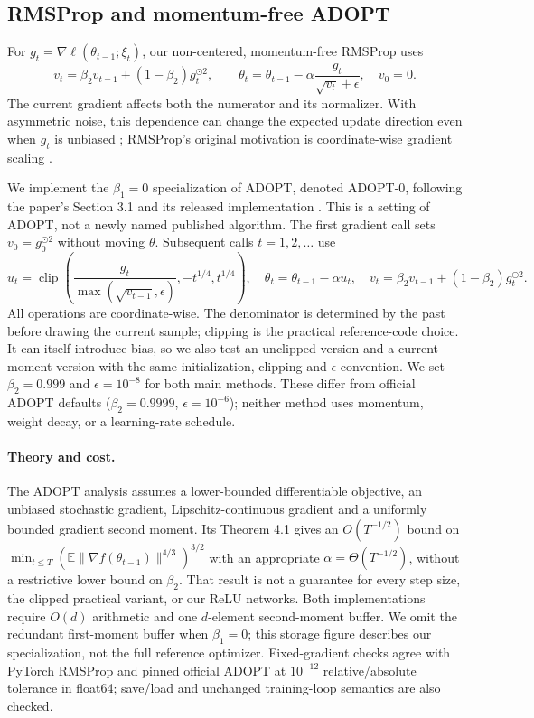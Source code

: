 \subsection{RMSProp and momentum-free ADOPT}\label{sec:method-m3}
For $g_t=\nabla\ell(\theta_{t-1};\xi_t)$, our non-centered, momentum-free RMSProp uses
\begin{equation}
 v_t=\beta_2v_{t-1}+(1-\beta_2)g_t^{\odot2},\qquad
 \theta_t=\theta_{t-1}-\alpha\frac{g_t}{\sqrt{v_t}+\epsilon},\quad v_0=0.
\end{equation}
The current gradient affects both the numerator and its normalizer. With asymmetric noise,
this dependence can change the expected update direction even when $g_t$ is unbiased
\citep{taniguchi2024adopt}; RMSProp's original motivation is coordinate-wise gradient scaling
\citep{hintonrmsprop}.

We implement the $\beta_1=0$ specialization of ADOPT, denoted ADOPT-0, following the
paper's Section 3.1 and its released implementation \citep{taniguchi2024adopt}.
This is a setting of ADOPT, not a newly named published algorithm.
The first gradient call sets $v_0=g_0^{\odot2}$ without moving $\theta$.
Subsequent calls $t=1,2,\ldots$ use
\begin{equation}\label{eq:m3-adopt}
 u_t=\operatorname{clip}\!\left(\frac{g_t}{\max(\sqrt{v_{t-1}},\epsilon)},-t^{1/4},t^{1/4}\right),\quad
 \theta_t=\theta_{t-1}-\alpha u_t,\quad
 v_t=\beta_2v_{t-1}+(1-\beta_2)g_t^{\odot2}.
\end{equation}
All operations are coordinate-wise. The denominator is determined by the past before drawing
the current sample; clipping is the practical reference-code choice. It can itself introduce
bias, so we also test an unclipped version and a current-moment version with the same
initialization, clipping and $\epsilon$ convention. We set $\beta_2=0.999$ and $\epsilon=10^{-8}$
for both main methods. These differ from official ADOPT defaults ($\beta_2=0.9999$,
$\epsilon=10^{-6}$); neither method uses momentum, weight decay, or a learning-rate schedule.

\paragraph{Theory and cost.}
The ADOPT analysis assumes a lower-bounded differentiable objective, an unbiased stochastic
gradient, Lipschitz-continuous gradient and a uniformly bounded gradient second moment.
Its Theorem 4.1 gives an $O(T^{-1/2})$ bound on
$\min_{t\leq T}(\mathbb E\|\nabla f(\theta_{t-1})\|^{4/3})^{3/2}$ with an appropriate
$\alpha=\Theta(T^{-1/2})$, without a restrictive lower bound on $\beta_2$.
That result is not a guarantee for every step size, the clipped practical variant, or our
ReLU networks. Both implementations require $O(d)$ arithmetic and one $d$-element
second-moment buffer. We omit the redundant first-moment buffer when $\beta_1=0$;
this storage figure describes our specialization, not the full reference optimizer.
Fixed-gradient checks agree with PyTorch RMSProp and pinned official ADOPT at
$10^{-12}$ relative/absolute tolerance in float64; save/load and unchanged training-loop
semantics are also checked.

